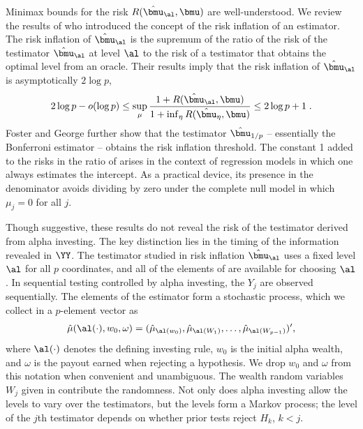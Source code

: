 \documentclass[12pt]{article}
\begin{document}
 Minimax bounds for the risk $R(\hat{\bmu}_\al,\bmu)$ are well-understood.  We
 review the results of \citet{fostergeorge94} who introduced the concept of the
 risk inflation of an estimator. \citep[][obtain similar results.]
  {donohojohnstone94} The risk inflation of $\hat{\bmu}_\al$ is the supremum of
 the ratio of the risk of the testimator $\hat{\bmu}_\al$ at level $\al$ to the
 risk of a testimator that obtains the optimal level from an oracle.  Their
 results imply that the risk inflation of $\hat{\bmu}_\al$ is asymptotically $2
 \log p$,
 \begin{equation}
    2 \log p - o(\log p) 
    \le
    \sup_\mu  \frac{1 + R(\hat{\bmu}_\al,\bmu)}
                   {1 + \inf_\eta{R(\hat{\bmu}_\eta,\bmu)}}  
    \le 
    2 \log p + 1 \;.
 \label{eq:ri}
 \end{equation}
 Foster and George further show that the testimator $\hat{\bmu}_{1/p}$ --
 essentially the Bonferroni estimator -- obtains the risk inflation threshold.
  The constant 1 added to the risks in the ratio of  arises in the
 context of regression models in which one always estimates the intercept.  As a
 practical device, its presence in the denominator avoids dividing by zero under
 the complete null model in which $\mu_j = 0$ for all $j$.


 Though suggestive, these results do not reveal the risk of the testimator
 derived from alpha investing.  The key distinction lies in the timing of the
 information revealed in $\YY$.  The testimator studied in risk inflation
 $\hat{\bmu}_\al$ uses a fixed level $\al$ for all $p$ coordinates, and all of
 the elements of \YY are available for choosing $\al$.  In sequential testing
 controlled by alpha investing, the $Y_j$ are observed sequentially.  The
 elements of the estimator form a stochastic process, which we collect in a
 $p$-element vector as
 \begin{equation}
   \hat\mu(\al(\cdot),w_0,\omega) = (\hat\mu_{\al(w_0)}, \hat\mu_{\al(W_1)}, \ldots, 
                       \hat\mu_{\al(W_{p-1})})',
 \label{eq:muHatAlphaInv}
 \end{equation}
 where $\al(\cdot)$ denotes the defining investing rule, $w_0$ is the initial
 alpha wealth, and $\omega$ is the payout earned when rejecting a hypothesis.
  We drop $w_0$ and $\omega$ from this notation when convenient and unambiguous.
  The wealth random variables $W_j$ given in  contribute the
 randomness.  Not only does alpha investing allow the levels to vary over the
 testimators, but the levels form a Markov process; the level of the $j$th
 testimator depends on whether prior tests reject $H_k$, $k < j$.
\end{document}
